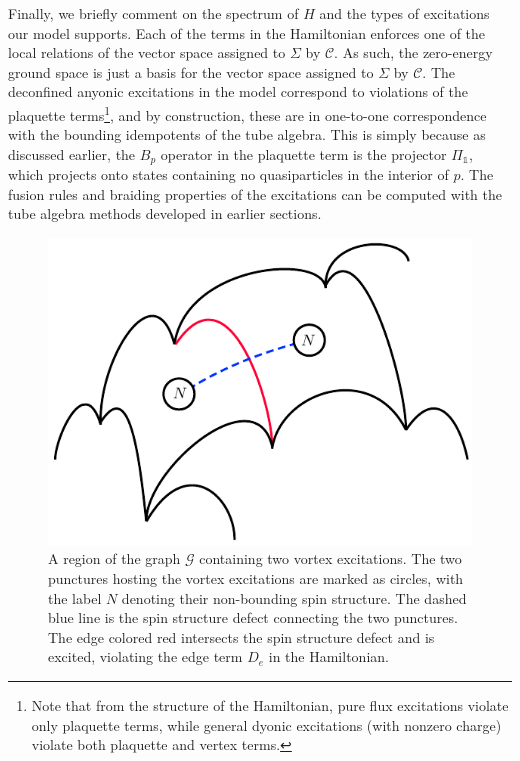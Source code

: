\documentclass[12pt,a4paper]{article}
\newcommand{\unit}{\mathds{1}}
\newcommand{\mcg}{\mathcal{G}}
\newcommand{\mcc}{\mathcal{C}}
\begin{document}
Finally, we briefly comment on the spectrum of $H$ and the types of excitations our model supports. 
Each of the terms in the Hamiltonian enforces one of the local relations of the vector space assigned to $\Sigma$ by $\mcc$. 
As such, the zero-energy ground space is just a basis for the vector space assigned to $\Sigma$ by $\mcc$.
The deconfined anyonic excitations in the model correspond to violations of the plaquette terms\footnote{Note that from the structure of the Hamiltonian, pure flux excitations violate only plaquette terms, while general dyonic excitations (with nonzero charge) violate both plaquette and vertex terms.}, and
by construction, these are in one-to-one correspondence with the bounding idempotents of the tube algebra. 
This is simply because as discussed earlier, the $B_p$ operator in the plaquette term is the projector $\Pi_\unit$, which projects onto states containing no quasiparticles in the interior of $p$. 
The fusion rules and braiding properties of the excitations can be computed with the tube algebra methods developed in earlier sections. 

\begin{figure}
\begin{center}
\includegraphics{graph_with_edge_excitation.pdf}
\caption{\label{lattice_w_vortices} A region of the graph $\mcg$ containing two vortex excitations. 
The two punctures hosting the vortex excitations are marked as circles, with the label $N$ denoting their non-bounding spin structure. 
The dashed blue line is the spin structure defect connecting the two punctures.
The edge colored red intersects the spin structure defect and is excited, violating the edge term $D_e$ in the Hamiltonian. 
}
\end{center}
\end{figure}
\end{document}
